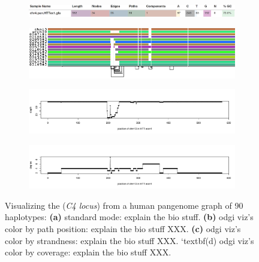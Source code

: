 \begin{figure}[h!]
	\begin{subfigure}{\linewidth}
		\caption{}
		\centering
		\includegraphics[width=1.0\linewidth]{fig/metrics/chr4_pan_HTTex1_gfa_multiqc_odgi_stats.png}  
		\label{fig:metrics-multiqc}
	\end{subfigure}
	\begin{subfigure}{\linewidth}
		\caption{}
		\centering
		\includegraphics[width=1.0\linewidth, trim=0 0 -1cm 0 ]{fig/metrics/chr4_pan_fa_a2fb268_e820cd3_9ea71d8_smooth_gfa_og_HTTex1_og_O_og_tiny_og_png_svg.pdf}  
		\label{fig:metrics-viz}
	\end{subfigure}
	\begin{subfigure}{\linewidth}
		\caption{}
		\centering
		\includegraphics[width=\linewidth,trim=+.225cm 0 +0.425cm +2cm]{fig/metrics/chr4_HTT_chm13_depth_w1_bed.pdf}  
		\label{fig:metrics-depth}
	\end{subfigure}
	\begin{subfigure}{1\linewidth}
		\caption{}
		\centering
		\includegraphics[width=\linewidth,trim=+.225cm 0 +.425cm +2cm]{fig/metrics/chr4_HTT_chm13_degree_w1_bed.pdf}  
		\label{fig:metrics-degree}
	\end{subfigure}
	\caption{Visualizing the (\textit{C4 locus}) from a human pangenome graph of 90 haplotypes: \textbf{(a)} standard mode: explain the bio stuff. \textbf{(b)} odgi viz's color by path position: explain the bio stuff XXX. \textbf{(c)} odgi viz's color by strandness: explain the bio stuff XXX. `textbf{(d)}  odgi viz's color by coverage: explain the bio stuff XXX.}
	\label{fig:odgi_viz}
\end{figure}
